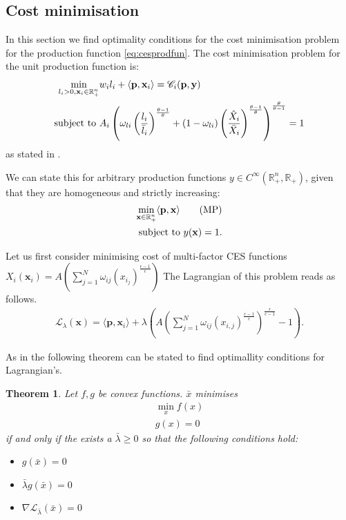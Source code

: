 \documentclass{article}
\newtheorem{theorem}{Theorem}
\begin{document}
\subsection{Cost minimisation}
In this section we find optimality conditions for the cost minimisation problem for the production function \eqref{eq:cesprodfun}.
The cost minimisation problem for the unit production function is:
\begin{align}
  \min_{l_i > 0,\mathbf x_{i} \in \mathbb R^n_+} & w_i  l_i + \langle \mathbf p,\mathbf x_{i} \rangle = \mathscr C_i(\mathbf p,\mathbf y)\\
  \text{subject to }& A_i \left(\omega_{li} \left( \frac{l_i}{\Bar{l}_i}\right)^{\frac{\theta-1}{\theta}} + (1-\omega_{li}) \left( \frac{\hat{X}_i}{\Bar{X}_i}\right)^{\frac{\theta-1}{\theta}} \right)^{\frac{\theta}{\theta-1}} = 1
\end{align}
as stated in \parencite[p.~62,85]{rayHandbookProductionEconomics2022}.

We can state this for arbitrary production functions $y \in C^\infty(\mathbb R^n_+,\mathbb R_+)$, given that they are homogeneous and strictly increasing: 
\begin{align}
  \label{eq:costmin}
  \min_{\mathbf x \in \mathbb R^n_+} \langle \mathbf p, \mathbf x \rangle \tag{MP} \\ 
  \text{subject to } y(\mathbf x) = 1. \notag
\end{align}

Let us first consider minimising cost of multi-factor CES functions $X_i(\mathbf x_i) = A \left( \sum_{j=1}^N \omega_{ij} \left( x_{i_j}\right)^{\frac{\epsilon-1}{\epsilon}} \right)$
The Lagrangian of this problem reads as follows.
\begin{align}
    \label{eq:lagrangian}
  \mathcal L_\lambda(\mathbf x) = \langle \mathbf p, \mathbf x_i \rangle + \lambda \left(A \left(  \sum_{j=1}^N \omega_{ij} \left( x_{i,j}\right)^{\frac{\epsilon-1}{\epsilon}} \right)^{\frac{\epsilon}{\epsilon-1}} - 1\right).
\end{align}

As in \parencite[p.281]{rockafellarConvexAnalysis1997} the following theorem can be stated to find optimallity conditions for Lagrangian's.

\begin{theorem}
  \label{th:lagrange}
  Let $f,g$ be convex functions. $\bar x$ minimises 
  \begin{align}
    \min_x f(x) \\
    g(x) = 0
  \end{align}
  if and only if the exists a $\bar\lambda \geq 0$ so that the following conditions hold: 
  \begin{itemize}
    \item $g(\bar x) = 0$
    \item $\bar \lambda g(\bar x) = 0 $
    \item $\nabla \mathcal L_{\bar \lambda }(\bar x) = 0$
  \end{itemize}
\end{theorem}
\end{document}
